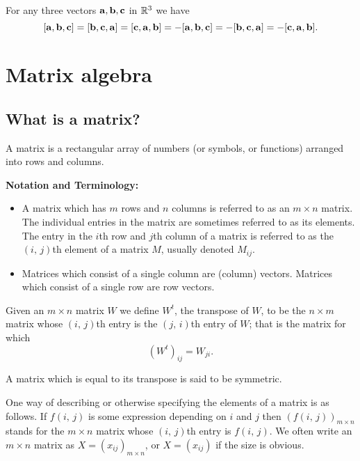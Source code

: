 \documentclass[10pt, a4paper]{article}
\begin{document}
\begin{lemma}
    For any three vectors $\mathbf{a, b, c}$ in $\mathbb{R} ^ 3$ we have
    \[
    [\mathbf{a, b, c}] = [\mathbf{b, c, a}] = [\mathbf{c, a, b}] = -[\mathbf{a, b, c}] = -[\mathbf{b, c, a}] = -[\mathbf{c, a, b}].
    \]
\end{lemma}

\section{Matrix algebra}

\subsection{What is a matrix?}

\begin{definition}[Matrix]
    A matrix is a rectangular array of numbers (or symbols, or functions) arranged into rows and columns.
\end{definition}

\textbf{Notation and Terminology:}
\begin{itemize}
    \item A matrix which has $m$ rows and $n$ columns is referred to as an $m \times n$ matrix. The individual entries in the matrix are sometimes referred to as its elements. The entry in the $i$th row and $j$th column of a matrix is referred to as the $(i,\,j)$th element of a matrix $M$, usually denoted $M_{ij}$.
    \item Matrices which consist of a single column are (column) vectors. Matrices which consist of a single row are row vectors.
\end{itemize}

\begin{definition}[Transpose]
    Given an $m \times n$ matrix $W$ we define $W ^ t$, the transpose of $W$, to be the $n \times m$ matrix whose $(i,\,j)$th entry is the $(j,\,i)$th entry of $W$; that is the matrix for which
    \[
    (W ^ t)_{ij} = W_{ji}.
    \]
\end{definition}

A matrix which is equal to its transpose is said to be symmetric.

One way of describing or otherwise specifying the elements of a matrix is as follows. If $f(i,\,j)$ is some expression depending on $i$ and $j$ then $(f(i,\,j))_{m \times n}$ stands for the $m \times n$ matrix whose $(i,\,j)$th entry is $f(i,\,j)$. We often write an $m \times n$ matrix as $X = (x_{ij})_{m \times n}$, or $X = (x_{ij})$ if the size is obvious.
\end{document}
